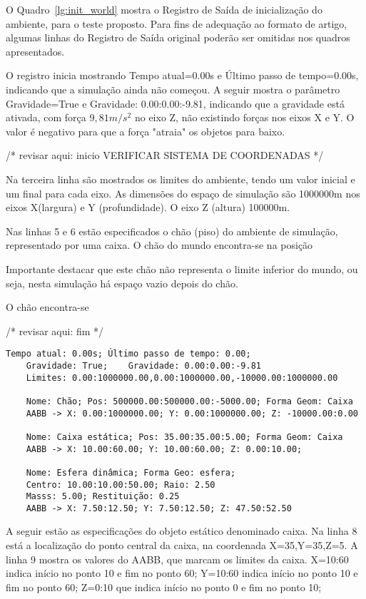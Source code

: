 \documentclass[12pt]{article}
\begin{document}
O Quadro~\ref{lg:init_world} mostra o Registro de Saída de inicialização do ambiente, para o teste proposto. Para fins de adequação ao formato de artigo, algumas linhas do Registro de Saída original poderão ser omitidas nos quadros apresentados.

O registro inicia mostrando Tempo atual=0.00s e Último passo de tempo=0.00s, indicando que a simulação ainda não começou. A seguir mostra o parâmetro Gravidade=True e Gravidade: 0.00:0.00:-9.81, indicando que a gravidade está ativada, com força $9,81 m/s^{2}$ no eixo Z, não existindo forças nos eixos X e Y. O valor é negativo para que a força "atraia" os objetos para baixo. 

/* revisar aqui:  inicio VERIFICAR SISTEMA DE COORDENADAS */ 

Na terceira linha são mostrados os limites do ambiente, tendo um valor inicial e um final para cada eixo. As dimensões do espaço de simulação são 1000000m nos eixos X(largura) e Y (profundidade). O eixo Z (altura) 100000m. 

Nas linhas 5 e 6 estão especificados o chão (piso) do ambiente de simulação, representado por uma caixa. O chão do mundo encontra-se na posição 


Importante destacar que este chão não representa o limite inferior do mundo, ou seja, nesta simulação há espaço vazio depois do chão. 

O chão encontra-se 


/* revisar aqui:   fim */

\begin{lstlisting}[frame=single,caption=Registro de Saída: Inicialização do ambiente\label{lg:init_world}]
	Tempo atual: 0.00s; Último passo de tempo: 0.00; 
	Gravidade: True; 	Gravidade: 0.00:0.00:-9.81
	Limites: 0.00:1000000.00,0.00:1000000.00,-10000.00:1000000.00
	
	Nome: Chão; Pos: 500000.00:500000.00:-5000.00; Forma Geom: Caixa
	AABB -> X: 0.00:1000000.00; Y: 0.00:1000000.00; Z: -10000.00:0.00 
	
	Nome: Caixa estática; Pos: 35.00:35.00:5.00; Forma Geom: Caixa
	AABB -> X: 10.00:60.00; Y: 10.00:60.00; Z: 0.00:10.00; 
	
	Nome: Esfera dinâmica; Forma Geo: esfera; 
	Centro: 10.00:10.00:50.00; Raio: 2.50
	Masss: 5.00; Restituição: 0.25
	AABB -> X: 7.50:12.50; Y: 7.50:12.50; Z: 47.50:52.50
\end{lstlisting}

A seguir estão as especificações do objeto estático denominado caixa. Na linha 8 está a localização do ponto central da caixa, na coordenada X=35,Y=35,Z=5. A linha 9 mostra os valores do AABB, que marcam os limites da caixa. X=10:60 indica início no ponto 10 e fim no ponto 60; Y=10:60 indica início no ponto 10 e fim no ponto 60; Z=0:10 que indica início no ponto 0 e fim no ponto 10;
\end{document}
